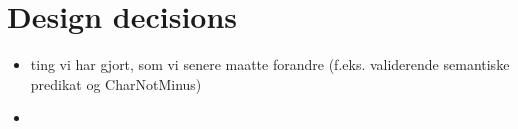 \section{Design decisions}
\begin{itemize}
\item ting vi har gjort, som vi senere maatte forandre (f.eks. validerende semantiske predikat og CharNotMinus)
\item 
\end{itemize}